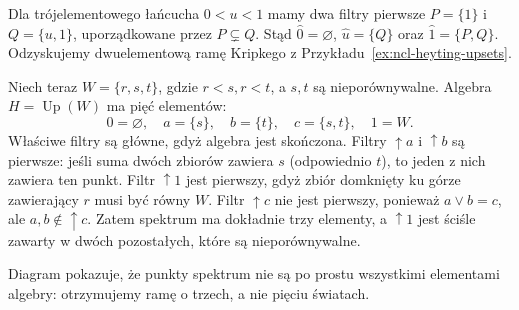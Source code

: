 \begin{przyklad}
\label{ex:ncl-heyting-prime-spectrum}
Dla trójelementowego łańcucha $0<u<1$ mamy dwa
filtry pierwsze $P=\{1\}$ i $Q=\{u,1\}$,
uporządkowane przez $P\subsetneq Q$.
Stąd $\widehat0=\varnothing$, $\widehat u=\{Q\}$
oraz $\widehat1=\{P,Q\}$.
Odzyskujemy dwuelementową ramę Kripkego
z Przykładu~\ref{ex:ncl-heyting-upsets}.

Niech teraz $W=\{r,s,t\}$, gdzie $r<s,r<t$,
a $s,t$ są nieporównywalne.
Algebra $H=\operatorname{Up}(W)$ ma pięć elementów:
\[
 0=\varnothing,\quad a=\{s\},\quad b=\{t\},\quad
 c=\{s,t\},\quad 1=W.
\]
Właściwe filtry są główne, gdyż algebra
jest skończona. Filtry $\uparrow a$ i $\uparrow b$
są pierwsze: jeśli suma dwóch zbiorów zawiera
$s$ (odpowiednio $t$), to jeden z nich zawiera
ten punkt. Filtr $\uparrow1$ jest pierwszy,
gdyż zbiór domknięty ku górze zawierający $r$
musi być równy $W$.
Filtr $\uparrow c$ nie jest pierwszy, ponieważ
$a\vee b=c$, ale $a,b\notin\uparrow c$.
Zatem spektrum ma dokładnie trzy elementy,
a $\uparrow1$ jest ściśle zawarty w dwóch
pozostałych, które są nieporównywalne.
\end{przyklad}

\begin{center}
\end{center}
Diagram pokazuje, że punkty spektrum nie są
po prostu wszystkimi elementami algebry:
otrzymujemy ramę o trzech, a nie pięciu światach.

